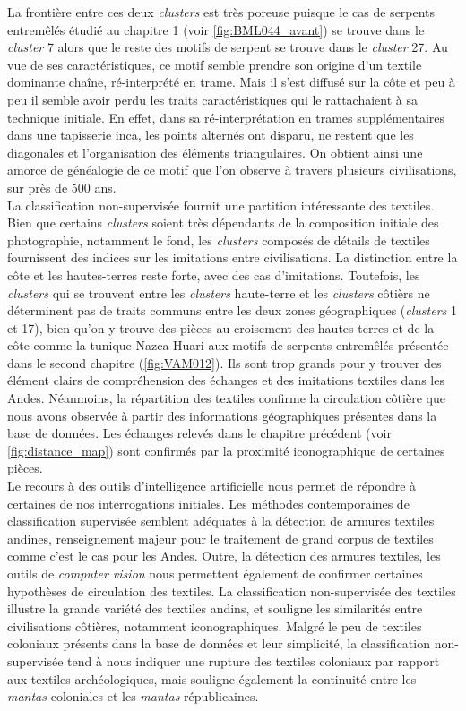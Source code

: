 \noindent La frontière entre ces deux \textit{clusters} est très poreuse puisque le cas de serpents entremêlés étudié au chapitre 1 (voir \ref{fig:BML044_avant}) se trouve dans le \textit{cluster} 7 alors que le reste des motifs de serpent se trouve dans le \textit{cluster} 27. Au vue de ses caractéristiques, ce motif semble prendre son origine d'un textile dominante chaîne, ré-interprété en trame. Mais il s'est diffusé sur la côte et peu à peu il semble avoir perdu les traits caractéristiques qui le rattachaient à sa technique initiale. En effet, dans sa ré-interprétation en trames supplémentaires dans une tapisserie inca, les points alternés ont disparu, ne restent que les diagonales et l'organisation des éléments triangulaires. On obtient ainsi une amorce de généalogie de ce motif que l'on observe à travers plusieurs civilisations, sur près de 500 ans.\\

La classification non-supervisée fournit une partition intéressante des textiles. Bien que certains \textit{clusters} soient très dépendants de la composition initiale des photographie, notamment le fond, les \textit{clusters} composés de détails de textiles fournissent des indices sur les imitations entre civilisations. La distinction entre la côte et les hautes-terres reste forte, avec des cas d'imitations. Toutefois, les \textit{clusters} qui se trouvent entre les \textit{clusters} \og haute-terre \fg \:et les \textit{clusters} \og côtièrs \fg \:ne déterminent pas de traits communs entre les deux zones géographiques (\textit{clusters} 1 et 17), bien qu'on y trouve des pièces au croisement des hautes-terres et de la côte comme la tunique Nazca-Huari aux motifs de serpents entremêlés présentée dans le second chapitre (\ref{fig:VAM012}). Ils sont trop grands pour y trouver des élément clairs de compréhension des échanges et des imitations textiles dans les Andes. Néanmoins, la répartition des textiles confirme la circulation côtière que nous avons observée à partir des informations géographiques présentes dans la base de données. Les échanges relevés dans le chapitre précédent (voir \ref{fig:distance_map}) sont confirmés par la proximité iconographique de certaines pièces. \\

Le recours à des outils d'intelligence artificielle nous permet de répondre à certaines de nos interrogations initiales. Les méthodes contemporaines de classification supervisée semblent adéquates à la détection de armures textiles andines, renseignement majeur pour le traitement de grand corpus de textiles comme c'est le cas pour les Andes. Outre, la détection des armures textiles, les outils de \textit{computer vision} nous permettent également de confirmer certaines hypothèses de circulation des textiles. La classification non-supervisée des textiles illustre la grande variété des textiles andins, et souligne les similarités entre civilisations côtières, notamment iconographiques. Malgré le peu de textiles coloniaux présents dans la base de données et leur simplicité, la classification non-supervisée tend à nous indiquer une rupture des textiles coloniaux par rapport aux textiles archéologiques, mais souligne également la continuité entre les \textit{mantas} coloniales et les \textit{mantas} républicaines.
